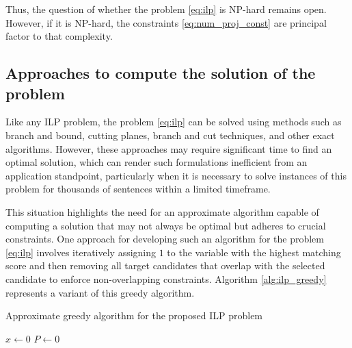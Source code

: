 Thus, the question of whether the problem \eqref{eq:ilp} is NP-hard remains open.
However, if it is NP-hard, the constraints \eqref{eq:num_proj_const} are
principal factor to that complexity.

\subsection{Approaches to compute the solution of the problem}
Like any ILP problem, the problem \eqref{eq:ilp} can be solved using methods such as
branch and bound, cutting planes, branch and cut techniques, and other exact algorithms.
However, these approaches may require significant time to find an optimal solution,
which can render such formulations inefficient from an application standpoint,
particularly when it is necessary to solve instances of this problem for thousands
of sentences within a limited timeframe.

This situation highlights the need for an approximate algorithm capable of computing
a solution that may not always be optimal but adheres to crucial constraints. One
approach for developing such an algorithm for the problem \eqref{eq:ilp} involves
iteratively assigning \( 1 \) to the variable with the highest matching score and
then removing all target candidates that overlap with the selected candidate to
enforce non-overlapping constraints. Algorithm \ref{alg:ilp_greedy} represents a
variant of this greedy algorithm.

\begin{algorithm}
  \caption{Approximate greedy algorithm for the proposed ILP problem} \label{alg:ilp_greedy}

  \( x \gets 0 \) \;
  \( P \gets 0 \) 
\end{algorithm}

